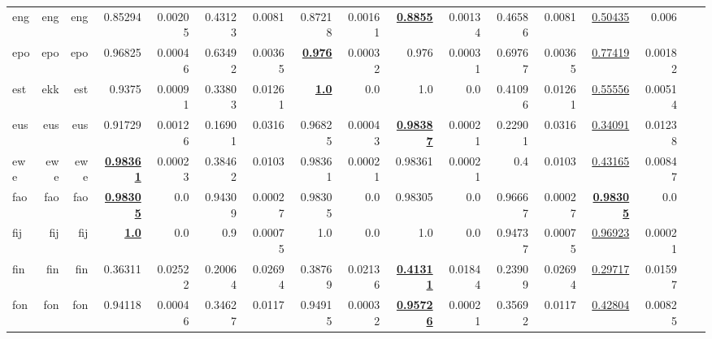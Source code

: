 \documentclass[11pt]{article}
\begin{document}
\begin{table*}[h]
{\begin{tabular}{lrrrrrrrrrrrrrrrr}
eng         & eng         & eng         & 0.85294         & 0.00205         & 0.43123         & 0.0081         & 0.87218         & 0.00161         & \textbf{\underline{0.8855}}         & 0.00134         & 0.46586         & 0.0081         & \underline{0.50435}         & 0.006         \\
epo         & epo         & epo         & 0.96825         & 0.00046         & 0.63492         & 0.00365         & \textbf{\underline{0.976}}         & 0.00032         & 0.976         & 0.00031         & 0.69767         & 0.00365         & \underline{0.77419}         & 0.00182         \\
est         & ekk         & est         & 0.9375         & 0.00091         & 0.33803         & 0.01261         & \textbf{\underline{1.0}}         & 0.0         & 1.0         & 0.0         & 0.41096         & 0.01261         & \underline{0.55556}         & 0.00514         \\
eus         & eus         & eus         & 0.91729         & 0.00126         & 0.16901         & 0.0316         & 0.96825         & 0.00043         & \textbf{\underline{0.98387}}         & 0.00021         & 0.22901         & 0.0316         & \underline{0.34091}         & 0.01238         \\
ewe         & ewe         & ewe         & \textbf{\underline{0.98361}}         & 0.00023         & 0.38462         & 0.0103         & 0.98361         & 0.00021         & 0.98361         & 0.00021         & 0.4         & 0.0103         & \underline{0.43165}         & 0.00847         \\
fao         & fao         & fao         & \textbf{\underline{0.98305}}         & 0.0         & 0.94309         & 0.00027         & 0.98305         & 0.0         & 0.98305         & 0.0         & 0.96667         & 0.00027         & \textbf{\underline{0.98305}}         & 0.0         \\
fij         & fij         & fij         & \textbf{\underline{1.0}}         & 0.0         & 0.9         & 0.00075         & 1.0         & 0.0         & 1.0         & 0.0         & 0.94737         & 0.00075         & \underline{0.96923}         & 0.00021         \\
fin         & fin         & fin         & 0.36311         & 0.02522         & 0.20064         & 0.02694         & 0.38769         & 0.02136         & \textbf{\underline{0.41311}}         & 0.01844         & 0.23909         & 0.02694         & \underline{0.29717}         & 0.01597         \\
fon         & fon         & fon         & 0.94118         & 0.00046         & 0.34627         & 0.0117         & 0.94915         & 0.00032         & \textbf{\underline{0.95726}}         & 0.00021         & 0.35692         & 0.0117         & \underline{0.42804}         & 0.00825         \\

\end{tabular}}
\end{table*}
\end{document}
